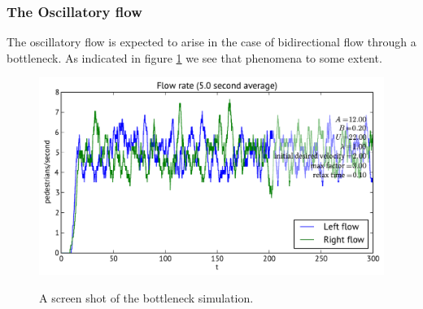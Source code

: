 \subsubsection{The Oscillatory flow}
The oscillatory flow is expected to arise in the case of bidirectional 
flow through a bottleneck. As indicated in figure \ref{fig:oscillitoryflow} 
we see that phenomena to some extent.

\begin{figure}[h]
\centering
{\includegraphics[scale=0.5]{Figures/bottleneck-flowrate-2.pdf}}
\caption{A screen shot of the bottleneck simulation.}
\label{fig:oscillitoryflow}
\end{figure}

